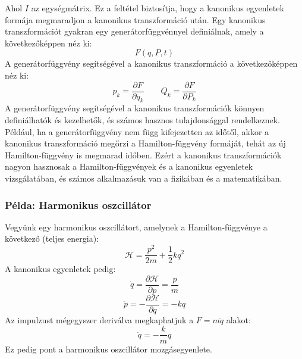 \documentclass[a4paper,12pt]{article}
\begin{document}
Ahol $I$ az egységmátrix. Ez a feltétel biztosítja, hogy a kanonikus egyenletek formája megmaradjon a kanonikus transzformáció után.
Egy kanonikus transzformációt gyakran egy generátorfüggvénnyel definiálnak, amely a következőképpen néz ki:
\begin{equation}
    F(q, P, t)
\end{equation}
A generátorfüggvény segítségével a kanonikus transzformáció a következőképpen néz ki:
\begin{equation}
    p_k = \frac{\partial F}{\partial q_k} \quad \quad Q_k = \frac{\partial F}{\partial P_k}
\end{equation}
A generátorfüggvény segítségével a kanonikus transzformációk könnyen definiálhatók és kezelhetők, és számos hasznos tulajdonsággal rendelkeznek. Például, ha a generátorfüggvény nem függ kifejezetten az időtől,
akkor a kanonikus transzformáció megőrzi a Hamilton-függvény formáját, tehát az új Hamilton-függvény is megmarad időben. Ezért a kanonikus transzformációk nagyon hasznosak a Hamilton-függvények és a kanonikus egyenletek vizsgálatában,
és számos alkalmazásuk van a fizikában és a matematikában.

\subsubsection*{Példa: Harmonikus oszcillátor}
Vegyünk egy harmonikus oszcillátort, amelynek a Hamilton-függvénye a következő (teljes energia):
\begin{equation}
    \mathcal{H} = \frac{p^2}{2m} + \frac{1}{2}k q^2
\end{equation}
A kanonikus egyenletek pedig:
\begin{equation}
    \dot{q} = \frac{\partial \mathcal{H}}{\partial p} = \frac{p}{m}
\end{equation}
\begin{equation}
    \dot{p} = -\frac{\partial \mathcal{H}}{\partial q} = -k q
\end{equation}
Az impulzust mégegyszer deriválva megkaphatjuk a $F = m\ddot{q}$ alakot:
\begin{equation}
    \ddot{q} = -\frac{k}{m} q
\end{equation}
Ez pedig pont a harmonikus oszcillátor mozgásegyenlete.
\end{document}
